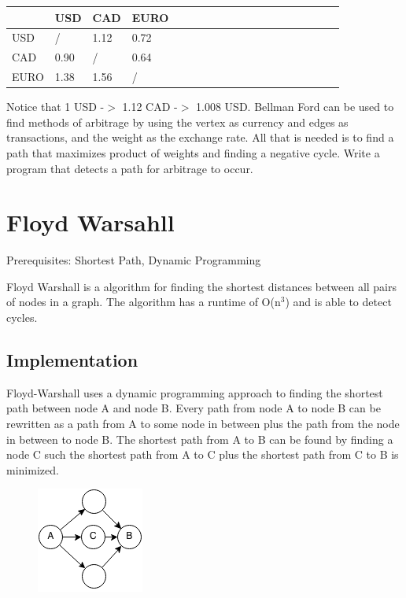 \documentclass[11pt,oneside]{book}
\makeatletter
\def\maxwidth#1{\ifdim\Gin@nat@width>#1 #1\else\Gin@nat@width\fi}
\makeatother
\begin{document}
\vspace{10px}\begin{tabulary}{0.4\linewidth}{|l|l|l|l|l|l|l|l|l|l|l|l|l|l|l|l|l|l|l}\hline


   &
  USD &
  CAD &
  EURO\\
\hline


  USD &
  / &
  1.12 &
  0.72\\

  CAD &
  0.90 &
  / &
  0.64\\

  EURO &
  1.38 &
  1.56 &
  /\\

\hline\end{tabulary}

Notice that 1 USD -$>$ 1.12 CAD -$>$ 1.008 USD. Bellman Ford can be used to find methods of arbitrage by using the vertex as currency and edges as transactions, and the weight as the exchange rate. All that is needed is to find a path that maximizes product of weights and finding a negative cycle. Write a program that detects a path for arbitrage to occur.

        \section{ Floyd Warsahll }
        

Prerequisites:  Shortest Path, Dynamic Programming

Floyd Warshall is a algorithm for finding the shortest distances between all pairs of nodes in a graph. The algorithm has a runtime of O(n$^{3}$) and is able to detect cycles.

\subsection{Implementation}

Floyd-Warshall uses a dynamic programming approach to finding the shortest path between node A and node B. Every path from node A to node B can be rewritten as a path from A to some node in between plus the path from the node in between to node B. The shortest path from A to B can be found by finding a node C such the shortest path from A to C plus the shortest path from C to B is minimized.

\vspace{5px}\begin{figure}[H]\centering
        \includegraphics[width=0.66\maxwidth{\textwidth}]{floydwarshall1.png}
        \end{figure}
\end{document}
